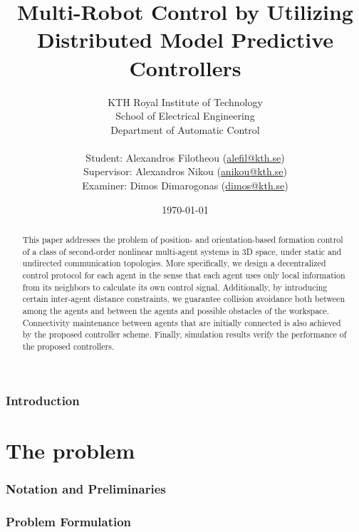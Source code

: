 \documentclass[a4paper,12pt,oneside]{article}
\title{\textbf{Multi-Robot Control by
Utilizing Distributed Model Predictive Controllers}}
\author{KTH Royal Institute of Technology \\
  School of Electrical Engineering \\
  Department of Automatic Control \\ \\
Student: Alexandros Filotheou (\href{mailto: alefil@kth.se}{alefil@kth.se}) \\
Supervisor: Alexandros Nikou (\href{mailto: anikou@kth.se}{anikou@kth.se}) \\
Examiner: Dimos Dimarogonas (\href{mailto: dimos@kth.se}{dimos@kth.se}) \\}
\date{\today}
\theoremstyle{definition}
\begin{document}
\maketitle

\begin{abstract}
	This paper addresses the problem of position- and orientation-based formation
  control of a class of second-order nonlinear multi-agent systems in $3$D
  space, under static and undirected communication topologies. More
  specifically, we design a decentralized control protocol for each agent in
  the sense that each agent uses only local information from its neighbors to
  calculate its own control signal. Additionally, by introducing certain
  inter-agent distance constraints, we guarantee collision avoidance both
  between among the agents and between the agents and possible obstacles of the
  workspace. Connectivity maintenance between agents that are initially
  connected is also achieved by the proposed controller scheme. Finally,
  simulation results verify the  performance of the proposed controllers.
\end{abstract}

\newpage
\tableofcontents
\newpage


\section{Introduction}

  
  \newpage

\part{The problem}
\newpage

  \section{Notation and Preliminaries}
    \label{sec:notation_reliminaries}

    
    
    
    \newpage


  \section{Problem Formulation}
    \label{sec:prob_formulation}
\end{document}
